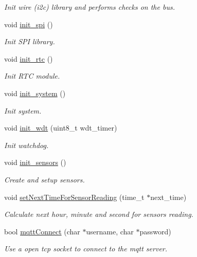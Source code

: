 \begin{DoxyCompactItemize}
\begin{DoxyCompactList}\small\item\em Init wire (i2c) library and performs checks on the bus. \end{DoxyCompactList}\item 
void \hyperlink{rmap_8ino_a8eb9780a3438ec02c70314744f91f3c7}{init\+\_\+spi} ()
\begin{DoxyCompactList}\small\item\em Init S\+PI library. \end{DoxyCompactList}\item 
void \hyperlink{rmap_8ino_ab985cc69f5f573113405b4f118c96d33}{init\+\_\+rtc} ()
\begin{DoxyCompactList}\small\item\em Init R\+TC module. \end{DoxyCompactList}\item 
void \hyperlink{rmap_8ino_afceb890a6ab9be73cc5481369538c705}{init\+\_\+system} ()
\begin{DoxyCompactList}\small\item\em Init system. \end{DoxyCompactList}\item 
void \hyperlink{rmap_8ino_a980e73df66b14b1190bc25da430a4f12}{init\+\_\+wdt} (uint8\+\_\+t wdt\+\_\+timer)
\begin{DoxyCompactList}\small\item\em Init watchdog. \end{DoxyCompactList}\item 
void \hyperlink{rmap_8ino_ac74850003fab6eb3269bfe043d0f939c}{init\+\_\+sensors} ()
\begin{DoxyCompactList}\small\item\em Create and setup sensors. \end{DoxyCompactList}\item 
void \hyperlink{rmap_8ino_a1686e2719fa4a37ef933458673973d28}{set\+Next\+Time\+For\+Sensor\+Reading} (time\+\_\+t $\ast$next\+\_\+time)
\begin{DoxyCompactList}\small\item\em Calculate next hour, minute and second for sensors reading. \end{DoxyCompactList}\item 
bool \hyperlink{rmap_8ino_a9f5e5ca8c47d4536dd1805e89fbb7db2}{mqtt\+Connect} (char $\ast$username, char $\ast$password)
\begin{DoxyCompactList}\small\item\em Use a open tcp socket to connect to the mqtt server. \end{DoxyCompactList}\item 

\end{DoxyCompactItemize}
